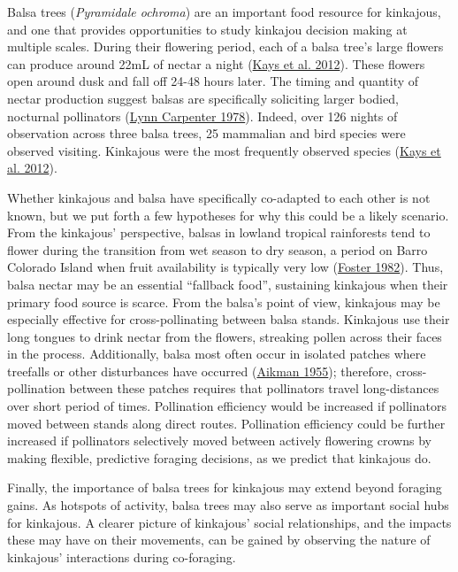 \documentclass[twoside,12pt,final]{ucthesis-CA2012}
\begin{document}
\begin{ucmainmatter}
Balsa trees (\emph{Pyramidale ochroma}) are an important food resource for kinkajous, and one that provides opportunities to study kinkajou decision making at multiple scales. During their flowering period, each of a balsa tree's large flowers can produce around 22mL of nectar a night (\protect\hyperlink{ref-kays2012}{Kays et al. 2012}). These flowers open around dusk and fall off 24-48 hours later. The timing and quantity of nectar production suggest balsas are specifically soliciting larger bodied, nocturnal pollinators (\protect\hyperlink{ref-lynncarpenter1978}{Lynn Carpenter 1978}). Indeed, over 126 nights of observation across three balsa trees, 25 mammalian and bird species were observed visiting. Kinkajous were the most frequently observed species (\protect\hyperlink{ref-kays2012}{Kays et al. 2012}).

Whether kinkajous and balsa have specifically co-adapted to each other is not known, but we put forth a few hypotheses for why this could be a likely scenario. From the kinkajous' perspective, balsas in lowland tropical rainforests tend to flower during the transition from wet season to dry season, a period on Barro Colorado Island when fruit availability is typically very low (\protect\hyperlink{ref-foster1982ecology}{Foster 1982}). Thus, balsa nectar may be an essential ``fallback food'', sustaining kinkajous when their primary food source is scarce. From the balsa's point of view, kinkajous may be especially effective for cross-pollinating between balsa stands. Kinkajous use their long tongues to drink nectar from the flowers, streaking pollen across their faces in the process. Additionally, balsa most often occur in isolated patches where treefalls or other disturbances have occurred (\protect\hyperlink{ref-aikman1955}{Aikman 1955}); therefore, cross-pollination between these patches requires that pollinators travel long-distances over short period of times. Pollination efficiency would be increased if pollinators moved between stands along direct routes. Pollination efficiency could be further increased if pollinators selectively moved between actively flowering crowns by making flexible, predictive foraging decisions, as we predict that kinkajous do.

Finally, the importance of balsa trees for kinkajous may extend beyond foraging gains. As hotspots of activity, balsa trees may also serve as important social hubs for kinkajous. A clearer picture of kinkajous' social relationships, and the impacts these may have on their movements, can be gained by observing the nature of kinkajous' interactions during co-foraging.


\end{ucmainmatter}
\end{document}
